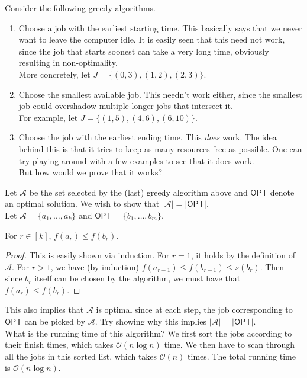 Consider the following greedy algorithms.

\begin{enumerate}
	\item Choose a job with the earliest starting time. This basically says that we never want to leave the computer idle. It is easily seen that this need not work, since the job that starts soonest can take a very long time, obviously resulting in non-optimality.\\
	More concretely, let $J = \{(0,3),(1,2),(2,3)\}$.

	\item Choose the smallest available job. This needn't work either, since the smallest job could overshadow multiple longer jobs that intersect it.\\
	For example, let $J=\{(1,5),(4,6),(6,10)\}$.

	\item Choose the job with the earliest ending time. This \textit{does} work. The idea behind this is that it tries to keep as many resources free as possible. One can try playing around with a few examples to see that it does work.\\
	But how would we prove that it works?
\end{enumerate}

Let $\mathcal{A}$ be the set selected by the (last) greedy algorithm above and $\mathsf{OPT}$ denote an optimal solution. We wish to show that $|\mathcal{A}|=|\mathsf{OPT}|$.\\
Let $\mathcal{A}=\{a_1,\ldots,a_k\}$ and $\mathsf{OPT}=\{b_1,\ldots,b_m\}$.

\begin{lemma}
For $r\in[k]$, $f(a_r) \leq f(b_r)$.
\end{lemma}
\begin{proof}
This is easily shown via induction. For $r=1$, it holds by the definition of $\mathcal{A}$. For $r>1$, we have (by induction) $f(a_{r-1}) \leq f(b_{r-1}) \leq s(b_r)$. Then since $b_r$ itself can be chosen by the algorithm, we must have that $f(a_r) \leq f(b_r)$.
\end{proof}

This also implies that $\mathcal{A}$ is optimal since at each step, the job corresponding to $\mathsf{OPT}$ can be picked by $\mathcal{A}$. Try showing why this implies $|\mathcal{A}|=|\mathsf{OPT}|$.\\
What is the running time of this algorithm? We first sort the jobs according to their finish times, which takes $\mathcal{O}(n\log n)$ time. We then have to scan through all the jobs in this sorted list, which takes $\mathcal{O}(n)$ times. The total running time is $\mathcal{O}(n\log n)$.

